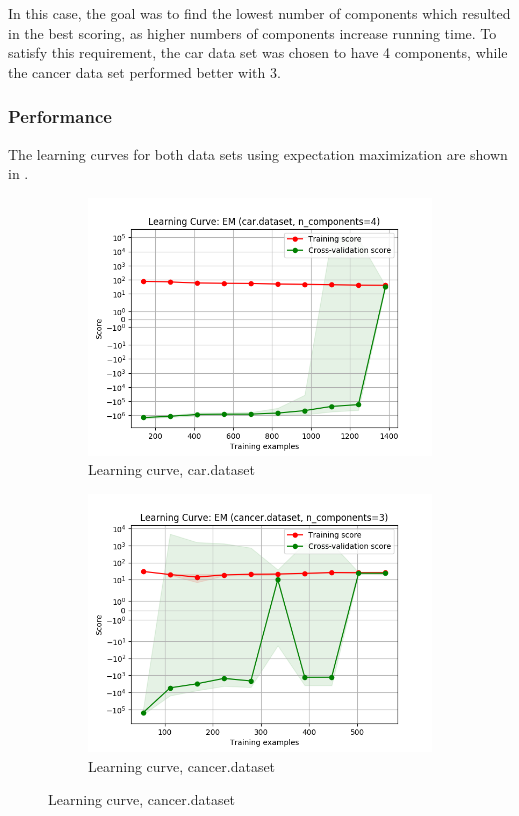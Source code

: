 \documentclass{article}
\begin{document}
        In this case, the goal was to find the lowest number of components which resulted in the best scoring, as higher numbers of components increase running time. To satisfy this requirement, the car data set was chosen to have 4 components, while the cancer data set performed better with 3.

      \subsubsection{Performance}
        The learning curves for both data sets using expectation maximization are shown in .

        \begin{figure}[htb]
        \centering

          \begin{subfigure}{0.4\textwidth}
            \includegraphics[width=\linewidth]{out/em/car-learning.png}
            \caption{Learning curve, car.dataset}
            \label{fig:em-learning-car}
          \end{subfigure}\hfil
          \begin{subfigure}{0.4\textwidth}
            \includegraphics[width=\linewidth]{out/em/cancer-learning.png}
            \caption{Learning curve, cancer.dataset}
            \label{fig:em-learning-cancer}
          \end{subfigure}


\end{figure}
\end{document}
